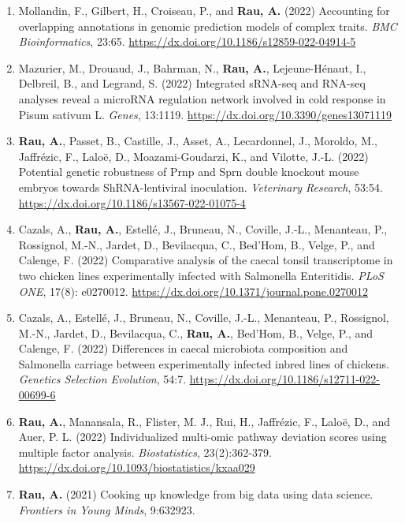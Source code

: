 \documentclass[11pt, a4paper]{awesome-cv}
\providecommand{\tightlist}{%
	\setlength{\itemsep}{0pt}\setlength{\parskip}{0pt}}
\begin{document}
\begin{enumerate}
\def\labelenumi{\arabic{enumi}.}
\tightlist
\item
  Mollandin, F., Gilbert, H., Croiseau, P., and \textbf{Rau, A.} (2022)
  Accounting for overlapping annotations in genomic prediction models of
  complex traits. \emph{BMC Bioinformatics}, 23:65.
  \url{https://dx.doi.org/10.1186/s12859-022-04914-5}
\item
  Mazurier, M., Drouaud, J., Bahrman, N., \textbf{Rau, A.},
  Lejeune-Hénaut, I., Delbreil, B., and Legrand, S. (2022) Integrated
  sRNA-seq and RNA-seq analyses reveal a microRNA regulation network
  involved in cold response in Pisum sativum L. \emph{Genes}, 13:1119.
  \url{https://dx.doi.org/10.3390/genes13071119}
\item
  \textbf{Rau, A.}, Passet, B., Castille, J., Asset, A., Lecardonnel,
  J., Moroldo, M., Jaffrézic, F., Laloë, D., Moazami-Goudarzi, K., and
  Vilotte, J.-L. (2022) Potential genetic robustness of Prnp and Sprn
  double knockout mouse embryos towards ShRNA-lentiviral inoculation.
  \emph{Veterinary Research}, 53:54.
  \url{https://dx.doi.org/10.1186/s13567-022-01075-4}
\item
  Cazals, A., \textbf{Rau, A.}, Estellé, J., Bruneau, N., Coville,
  J.-L., Menanteau, P., Rossignol, M.-N., Jardet, D., Bevilacqua, C.,
  Bed'Hom, B., Velge, P., and Calenge, F. (2022) Comparative analysis of
  the caecal tonsil transcriptome in two chicken lines experimentally
  infected with Salmonella Enteritidis. \emph{PLoS ONE}, 17(8):
  e0270012. \url{https://dx.doi.org/10.1371/journal.pone.0270012}
\item
  Cazals, A., Estellé, J., Bruneau, N., Coville, J.-L., Menanteau, P.,
  Rossignol, M.-N., Jardet, D., Bevilacqua, C., \textbf{Rau, A.},
  Bed'Hom, B., Velge, P., and Calenge, F. (2022) Differences in caecal
  microbiota composition and Salmonella carriage between experimentally
  infected inbred lines of chickens. \emph{Genetics Selection
  Evolution}, 54:7. \url{https://dx.doi.org/10.1186/s12711-022-00699-6}
\item
  \textbf{Rau, A.}, Manansala, R., Flister, M. J., Rui, H., Jaffrézic,
  F., Laloë, D., and Auer, P. L. (2022) Individualized multi-omic
  pathway deviation scores using multiple factor analysis.
  \emph{Biostatistics}, 23(2):362-379.
  \url{https://dx.doi.org/10.1093/biostatistics/kxaa029}
\item
  \textbf{Rau, A.} (2021) Cooking up knowledge from big data using data
  science. \emph{Frontiers in Young Minds}, 9:632923.

\end{enumerate}
\end{document}
